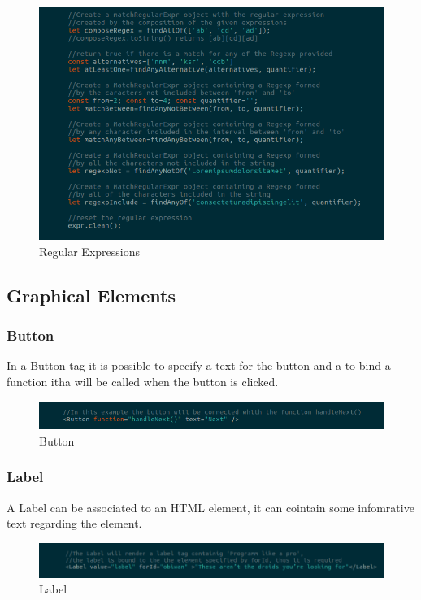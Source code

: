 \begin{figure}[H]
	\centering
	\includegraphics[width=14cm]{../../documenti/UserManualFramework/framework_model/6framework_model_regexp2.png}
	\caption{Regular Expressions}
\end{figure}

\subsection{Graphical Elements}
\subsubsection{Button}
In a Button tag it is possible to specify a text for the button and a to bind a function itha will be called when the button is clicked.
\begin{figure}[H]
	\centering
	\includegraphics[width=14cm]{../../documenti/UserManualFramework/framework_view/11framework_view_button.png}
	\caption{Button}
\end{figure}

\subsubsection{Label}
A Label can be associated to an HTML element, it can cointain some infomrative text regarding the element.
\begin{figure}[H]
	\centering
	\includegraphics[width=14cm]{../../documenti/UserManualFramework/framework_view/12framework_view_label.png}
	\caption{Label}
\end{figure}

